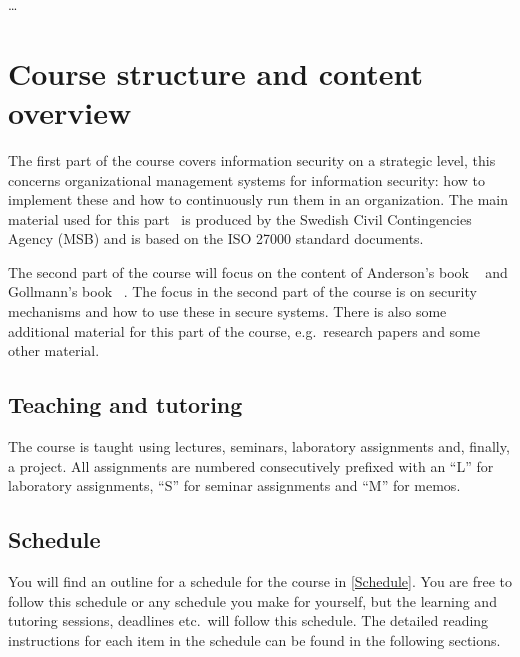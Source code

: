 \dots


\section{Course structure and content overview}
\label{sec:outline}

The first part of the course covers information security on a strategic level, 
this concerns organizational management systems for information security: how 
to implement these and how to continuously run them in an organization.
The main material used for this part~\cite{%
  MSB2011itm,MSB2011sle,MSB2011p,%
	MSB2011v,MSB2011r,MSB2011gap,MSB2011gb,%
	MSB2011vs,MSB2011us,MSB2011upo,%
	MSB2011pg,MSB2011koa,MSB2011i,%
	MSB2011o,MSB2011g,MSB2011lg,%
	MSB2011ulo,MSB2011kf,MSB2011fa%
} is produced by the Swedish Civil Contingencies Agency (MSB) and is based on 
the ISO 27000 standard documents.

The second part of the course will focus on the content of Anderson's book 
~\cite{Anderson2008sea} and Gollmann's book 
~\cite{Gollmann2011cs}.
The focus in the second part of the course is on security mechanisms and how to 
use these in secure systems.
There is also some additional material for this part of the course, e.g.\ 
research papers and some other material.

\subsection{Teaching and tutoring}

The course is taught using lectures, seminars, laboratory assignments and, 
finally, a project.
All assignments are numbered consecutively prefixed with an \enquote{L} for 
laboratory assignments, \enquote{S} for seminar assignments and \enquote{M} for 
memos.

\subsection{Schedule}

You will find an outline for a schedule for the course in \cref{Schedule}.
You are free to follow this schedule or any schedule you make for yourself, but 
the learning and tutoring sessions, deadlines etc.\ will follow this schedule.
The detailed reading instructions for each item in the schedule can be found in 
the following sections.

